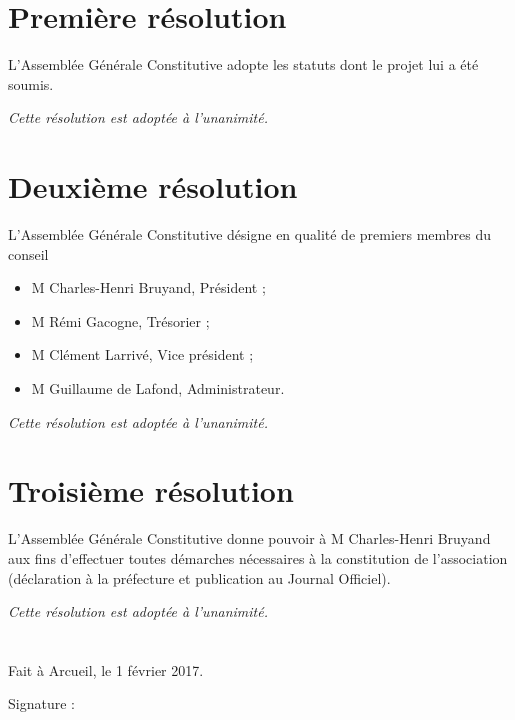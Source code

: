 \documentclass[a4paper,oneside,12pt]{article}
\begin{document}
\bigskip

\section*{Première résolution}

L’Assemblée Générale Constitutive adopte les statuts dont le projet lui a été soumis.

\medbreak

\begin{flushright}
  \textit{Cette résolution est adoptée à l’unanimité.}
\end{flushright}

\section*{Deuxième résolution}

L’Assemblée Générale Constitutive désigne en qualité de premiers membres du conseil

\bigskip

\begin{itemize}
\item M Charles-Henri Bruyand, Président ;
\item M Rémi Gacogne, Trésorier ;
\item M Clément Larrivé, Vice président ;
\item M Guillaume de Lafond, Administrateur.
\end{itemize}

\medbreak

\begin{flushright}
  \textit{Cette résolution est adoptée à l’unanimité.}
\end{flushright}

\section*{Troisième résolution}

L'Assemblée Générale Constitutive donne pouvoir à M Charles-Henri Bruyand aux fins d'effectuer toutes démarches nécessaires à la constitution de l'association (déclaration à la préfecture et publication au Journal Officiel).

\medbreak

\begin{flushright}
  \textit{Cette résolution est adoptée à l’unanimité.}
\end{flushright}

\section*{}

Fait à Arcueil, le 1 février 2017.

\bigskip

Signature :
\end{document}
